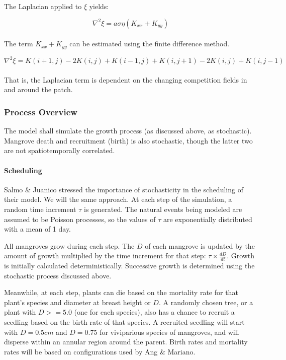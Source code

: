 The Laplacian applied to $\xi$ yields:

\begin{equation}
\nabla^2 \xi = a\sigma\eta (K_{xx} + K_{yy}) 
\end{equation}\\

The term $K_{xx} + K_{yy}$ can be estimated using the finite difference method.

\begin{equation}
\nabla^2 \xi = K(i+1, j) - 2K(i,j) + K(i-1,j) + K(i, j+1) - 2K(i,j) + K(i,j-1)
\end{equation}\\ 

That is, the Laplacian term is dependent on the changing competition fields in and around the patch.

\subsubsection{Process Overview}
The model shall simulate the growth process (as discussed above, as stochastic). Mangrove death and recruitment (birth) is also stochastic, though the latter two are not spatiotemporally correlated.

\paragraph{Scheduling}
Salmo \& Juanico stressed the importance of stochasticity in the scheduling of their model. We will the same approach. At each step of the simulation, a random time increment $\tau$ is generated. The natural events being modeled are assumed to be Poisson processes, so the values of $\tau$ are exponentially distributed with a mean of 1 day.

All mangroves grow during each step. The $D$ of each mangrove is updated by the amount of growth multiplied by the time increment for that step: $\tau \times \frac{dD}{dt}$. Growth is initially calculated deterministically. Successive growth is determined using the stochastic process discussed above.

Meanwhile, at each step, plants can die based on the mortality rate for that plant's species and diameter at breast height or $D$. A randomly chosen tree, or a plant with $D >= 5.0$ (one for each species), also has a chance to recruit a seedling based on the birth rate of that species. A recruited seedling will start with $D = 0.5 cm$ and $D = 0.75$ for viviparious species of mangroves, and will disperse within an annular region around the parent. Birth rates and mortality rates will be based on configurations used by Ang \& Mariano.

